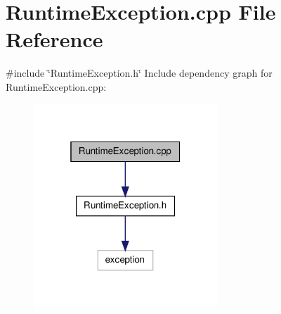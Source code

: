 \section{\-Runtime\-Exception.\-cpp \-File \-Reference}
\label{_runtime_exception_8cpp}
{\ttfamily \#include \char`\"{}\-Runtime\-Exception.\-h\char`\"{}}\*
\-Include dependency graph for \-Runtime\-Exception.\-cpp\-:
\nopagebreak
\begin{figure}[H]
\begin{center}
\leavevmode
\includegraphics[width=196pt]{_runtime_exception_8cpp__incl}
\end{center}
\end{figure}
